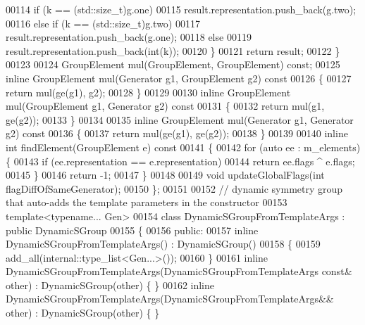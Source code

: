 \begin{DoxyCode}
00114         \textcolor{keywordflow}{if} (k == (std::size\_t)g.one)
00115           result.representation.push\_back(g.two);
00116         \textcolor{keywordflow}{else} \textcolor{keywordflow}{if} (k == (std::size\_t)g.two)
00117           result.representation.push\_back(g.one);
00118         \textcolor{keywordflow}{else}
00119           result.representation.push\_back(\textcolor{keywordtype}{int}(k));
00120       \}
00121       \textcolor{keywordflow}{return} result;
00122     \}
00123 
00124     GroupElement mul(GroupElement, GroupElement) \textcolor{keyword}{const};
00125     \textcolor{keyword}{inline} GroupElement mul(Generator g1, GroupElement g2)\textcolor{keyword}{ const}
00126 \textcolor{keyword}{    }\{
00127       \textcolor{keywordflow}{return} mul(ge(g1), g2);
00128     \}
00129 
00130     \textcolor{keyword}{inline} GroupElement mul(GroupElement g1, Generator g2)\textcolor{keyword}{ const}
00131 \textcolor{keyword}{    }\{
00132       \textcolor{keywordflow}{return} mul(g1, ge(g2));
00133     \}
00134 
00135     \textcolor{keyword}{inline} GroupElement mul(Generator g1, Generator g2)\textcolor{keyword}{ const}
00136 \textcolor{keyword}{    }\{
00137       \textcolor{keywordflow}{return} mul(ge(g1), ge(g2));
00138     \}
00139 
00140     \textcolor{keyword}{inline} \textcolor{keywordtype}{int} findElement(GroupElement e)\textcolor{keyword}{ const}
00141 \textcolor{keyword}{    }\{
00142       \textcolor{keywordflow}{for} (\textcolor{keyword}{auto} ee : m\_elements) \{
00143         \textcolor{keywordflow}{if} (ee.representation == e.representation)
00144           \textcolor{keywordflow}{return} ee.flags ^ e.flags;
00145       \}
00146       \textcolor{keywordflow}{return} -1;
00147     \}
00148 
00149     \textcolor{keywordtype}{void} updateGlobalFlags(\textcolor{keywordtype}{int} flagDiffOfSameGenerator);
00150 \};
00151 
00152 \textcolor{comment}{// dynamic symmetry group that auto-adds the template parameters in the constructor}
00153 \textcolor{keyword}{template}<\textcolor{keyword}{typename}... Gen>
00154 \textcolor{keyword}{class }DynamicSGroupFromTemplateArgs : \textcolor{keyword}{public} DynamicSGroup
00155 \{
00156   \textcolor{keyword}{public}:
00157     \textcolor{keyword}{inline} DynamicSGroupFromTemplateArgs() : DynamicSGroup()
00158     \{
00159       add\_all(internal::type\_list<Gen...>());
00160     \}
00161     \textcolor{keyword}{inline} DynamicSGroupFromTemplateArgs(DynamicSGroupFromTemplateArgs \textcolor{keyword}{const}& other) : DynamicSGroup(other)
       \{ \}
00162     \textcolor{keyword}{inline} DynamicSGroupFromTemplateArgs(DynamicSGroupFromTemplateArgs&& other) : DynamicSGroup(other) \{ \}

\end{DoxyCode}
